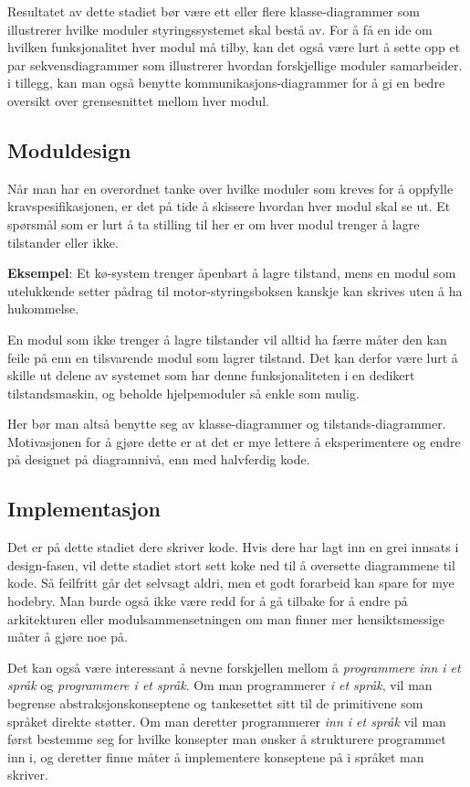 Resultatet av dette stadiet bør være ett eller flere klasse-diagrammer som illustrerer hvilke moduler styringssystemet skal bestå av. For å få en ide om hvilken funksjonalitet hver modul må tilby, kan det også være lurt å sette opp et par sekvensdiagrammer som illustrerer hvordan forskjellige moduler samarbeider. i tillegg, kan man også benytte kommunikasjons-diagrammer for å gi en bedre oversikt over grensesnittet mellom hver modul.

\subsection{Moduldesign}
Når man har en overordnet tanke over hvilke moduler som kreves for å oppfylle kravspesifikasjonen, er det på tide å skissere hvordan hver modul skal se ut. Et spørsmål som er lurt å ta stilling til her er om hver modul trenger å lagre tilstander eller ikke.

\textbf{Eksempel}: Et kø-system trenger åpenbart å lagre tilstand, mens en modul som utelukkende setter pådrag til motor-styringsboksen kanskje kan skrives uten å ha hukommelse.

En modul som ikke trenger å lagre tilstander vil alltid ha færre måter den kan feile på enn en tilsvarende modul som lagrer tilstand. Det kan derfor være lurt å skille ut delene av systemet som har denne funksjonaliteten i en dedikert tilstandsmaskin, og beholde hjelpemoduler så enkle som mulig.

Her bør man altså benytte seg av klasse-diagrammer og tilstands-diagrammer. Motivasjonen for å gjøre dette er at det er mye lettere å eksperimentere og endre på designet på diagramnivå, enn med halvferdig kode.

\subsection{Implementasjon}


Det er på dette stadiet dere skriver kode. Hvis dere har lagt inn en grei innsats i design-fasen, vil dette stadiet stort sett koke ned til å oversette diagrammene til kode. Så feilfritt går det selvsagt aldri, men et godt forarbeid kan spare for mye hodebry. Man burde også ikke være redd for å gå tilbake for å endre på arkitekturen eller modulsammensetningen om man finner mer hensiktsmessige måter å gjøre noe på.

Det kan også være interessant å nevne forskjellen mellom å \textit{programmere inn i et språk} og \textit{programmere i et språk}. Om man programmerer \textit{i et språk}, vil man begrense abstraksjonskonseptene og tankesettet sitt til de primitivene som språket direkte støtter. Om man deretter programmerer \textit{inn i et språk} vil man først bestemme seg for hvilke konsepter man ønsker å strukturere programmet inn i, og deretter finne måter å implementere konseptene på i språket man skriver.

